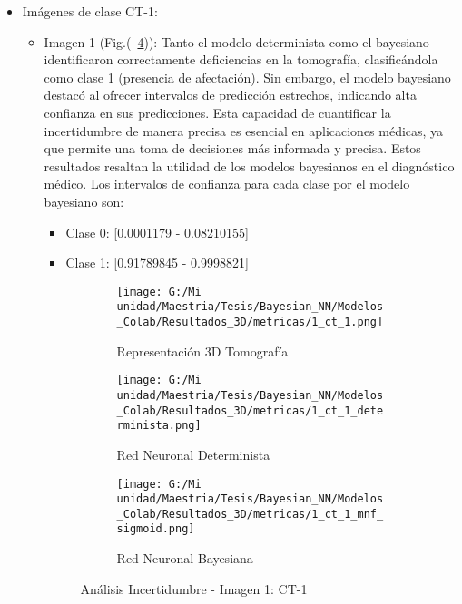 \documentclass[10pt, oneside, a4paper]{article}
\begin{document}
	\begin{itemize}
	\item Imágenes de clase CT-1:
	
	\begin{itemize}
	\item Imagen 1 (Fig.(~\ref{fig:layout})): Tanto el modelo determinista como el bayesiano identificaron correctamente deficiencias en la tomografía, clasificándola como clase 1 (presencia de afectación). Sin embargo, el modelo bayesiano destacó al ofrecer intervalos de predicción estrechos, indicando alta confianza en sus predicciones. Esta capacidad de cuantificar la incertidumbre de manera precisa es esencial en aplicaciones médicas, ya que permite una toma de decisiones más informada y precisa. Estos resultados resaltan la utilidad de los modelos bayesianos en el diagnóstico médico.
	Los intervalos de confianza para cada clase por el modelo bayesiano son:
	\begin{itemize}
	\item Clase 0: [0.0001179 - 0.08210155] 
	\item Clase 1: [0.91789845 - 0.9998821]
	\end{itemize} 

\begin{figure}[H]
	\centering
	\begin{subfigure}[b]{0.6\textwidth}
		\centering
		\texttt{[image: G:/Mi unidad/Maestria/Tesis/Bayesian\_NN/Modelos\_Colab/Resultados\_3D/metricas/1\_ct\_1.png]} %
		\caption{Representación 3D Tomografía}
		\label{fig:1_ct1_1}
	\end{subfigure}
	
	\medskip
	
	\begin{subfigure}[b]{0.45\textwidth}
		\centering
		\texttt{[image: G:/Mi unidad/Maestria/Tesis/Bayesian\_NN/Modelos\_Colab/Resultados\_3D/metricas/1\_ct\_1\_determinista.png]}
		\caption{Red Neuronal Determinista}
		\label{fig:1_ct1_2}
	\end{subfigure}
	\hfill
	\begin{subfigure}[b]{0.45\textwidth}
		\centering
		\texttt{[image: G:/Mi unidad/Maestria/Tesis/Bayesian\_NN/Modelos\_Colab/Resultados\_3D/metricas/1\_ct\_1\_mnf\_sigmoid.png]}
		\caption{Red Neuronal Bayesiana}
		\label{fig:1_ct1_3}
	\end{subfigure}
	
	\caption{Análisis Incertidumbre - Imagen 1: CT-1}
	\label{fig:layout}
\end{figure}
	

\end{itemize}
\end{itemize}
\end{document}
